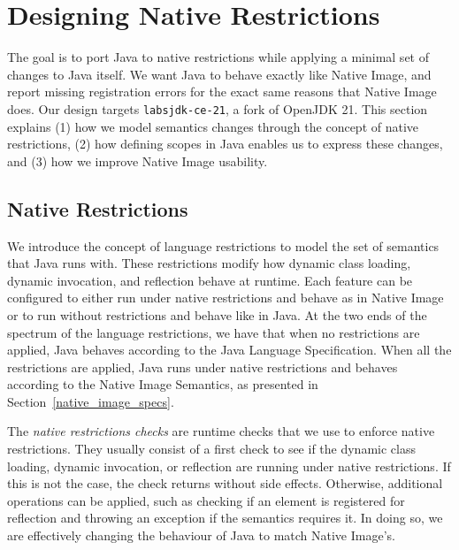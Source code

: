 \chapter{Designing Native Restrictions}

The goal is to port Java to native restrictions while applying a minimal set of changes to Java itself. We want Java to behave exactly like Native Image, and report missing registration errors for the exact same reasons that Native Image does. Our design targets \verb|labsjdk-ce-21|, a fork of OpenJDK 21. 
This section explains (1) how we model semantics changes through the concept of native restrictions, (2) how defining scopes in Java enables us to express these changes, and (3) how we improve Native Image usability.

\section{Native Restrictions}
We introduce the concept of language restrictions to model the set of semantics that Java runs with. These restrictions modify how dynamic class loading, dynamic invocation, and reflection behave at runtime. Each feature can be configured to either run under native restrictions and behave as in Native Image or to run without restrictions and behave like in Java.
At the two ends of the spectrum of the language restrictions, we have that when no restrictions are applied, Java behaves according to the Java Language Specification. When all the restrictions are applied, Java runs under native restrictions and behaves according to the Native Image Semantics, as presented in Section~\ref{native_image_specs}. 

The \emph{native restrictions checks} are runtime checks that we use to enforce native restrictions. They usually consist of a first check to see if the dynamic class loading, dynamic invocation, or reflection are running under native restrictions. If this is not the case, the check returns without side effects. Otherwise, additional operations can be applied, such as checking if an element is registered for reflection and throwing an exception if the semantics requires it. In doing so, we are effectively changing the behaviour of Java to match Native Image's.

